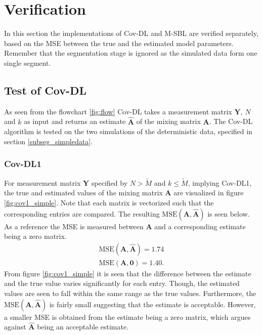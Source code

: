 \section{Verification}
In this section the implementations of Cov-DL and M-SBL are verified separately, based on the MSE between the true and the estimated model parameters.
Remember that the segmentation stage is ignored as the simulated data form one single segment.    

\subsection{Test of Cov-DL}
As seen from the flowchart \ref{fig:flow} Cov-DL takes a measurement matrix $\mathbf{Y}$, $N$ and $k$ as input and returns an estimate $\hat{\mathbf{A}}$ of the mixing matrix $\mathbf{A}$. 
The Cov-DL algorithm is tested on the two simulations of the deterministic data, specified in section \ref{subseg_simpledata}. 

\subsubsection{Cov-DL1}
For measurement matrix $\mathbf{Y}$ specified by $N > \widetilde{M}$ and $k \leq \widetilde{M}$, implying Cov-DL1, the true and estimated values of the mixing matrix $\mathbf{A}$ are visualized in figure \ref{fig:cov1_simple}. 
Note that each matrix is vectorized such that the corresponding entries are compared.  
The resulting $\text{MSE}(\mathbf{A}, \hat{\mathbf{A}})$ is seen below. 
As a reference the MSE is measured between $\mathbf{A}$ and a corresponding estimate being a zero matrix.   
\begin{align*}
\text{MSE}(\mathbf{A}, \hat{\mathbf{A}}) = 1.74 \\
\text{MSE}(\mathbf{A}, \mathbf{0}) = 1.40.
\end{align*}
From figure \ref{fig:cov1_simple} it is seen that the difference between the estimate and the true value varies significantly for each entry. 
Though, the estimated values are seen to fall within the same range as the true values.
Furthermore, the $\text{MSE}(\mathbf{A}, \hat{\mathbf{A}})$ is fairly small suggesting that the estimate is acceptable. However, a smaller MSE is obtained from the estimate being a zero matrix, which argues against $\hat{\mathbf{A}}$ being an acceptable estimate. 

